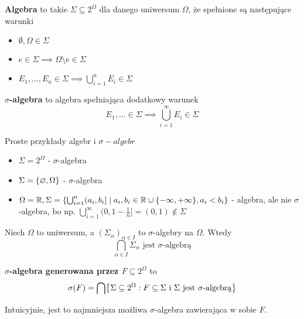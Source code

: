 \begin{definition}
	\textbf{Algebra} to takie \(\Sigma \subseteq 2^{\Omega}\) dla danego uniwersum \(\Omega\), że spełnione są następujące warunki
	\begin{itemize}
		\item \(\emptyset, \Omega \in \Sigma\)
		\item \(e \in \Sigma \implies \Omega \setminus e \in \Sigma\)
		\item \(E_1, \dots, E_n \in \Sigma \implies \bigcup_{i=1}^n E_i \in \Sigma\)
	\end{itemize}
\end{definition}

\begin{definition}
	\label{sigma-algebra-definition}
	\textbf{\(\sigma\)-algebra} to algebra spełniająca dodatkowy warunek
	\[
		E_1, \dots \in \Sigma \implies \bigcup_{i=1}^{\infty} E_i \in \Sigma
	\]
\end{definition}

\begin{example}
	Proste przykłady algebr i \(\sigma-algebr\)
	\begin{itemize}
		\item \(\Sigma = 2^{\Omega}\) - \(\sigma\)-algebra
		\item \(\Sigma = \set{\emptyset, \Omega}\) - \(\sigma\)-algebra
		\item \(\Omega = \real, \Sigma = \set{\bigcup_{i=1}^n (a_i, b_i] \mid a_i, b_i \in \real \cup \set{-\infty, +\infty}, a_i < b_i}\) - algebra, ale nie \(\sigma\)-algebra, bo np. \(\bigcup_{i=1}^\infty (0, 1 - \frac{1}{n}] = (0, 1) \notin \Sigma\)
	\end{itemize}
\end{example}

\begin{lemma}
	Niech \(\Omega\) to uniwersum, a \((\Sigma_\alpha)_{\alpha \in I}\) to \(\sigma\)-algebry na \(\Omega\). Wtedy
	\[
		\bigcap_{\alpha \in I} \Sigma_\alpha \text{ jest \(\sigma\)-algebrą}
	\]
\end{lemma}

\begin{definition}
	\textbf{\(\sigma\)-algebra generowana przez \(F \subseteq 2^\Omega\)} to
	\[
		\sigma(F) = \bigcap \set{\Sigma \subseteq 2^\Omega : F \subseteq \Sigma \text{ i } \Sigma \text{ jest } \sigma \text{-algebrą}}
	\]
	
	Intuicyjnie, jest to najmniejsza możliwa \(\sigma\)-algebra zawierająca w sobie \(F\).
\end{definition}

